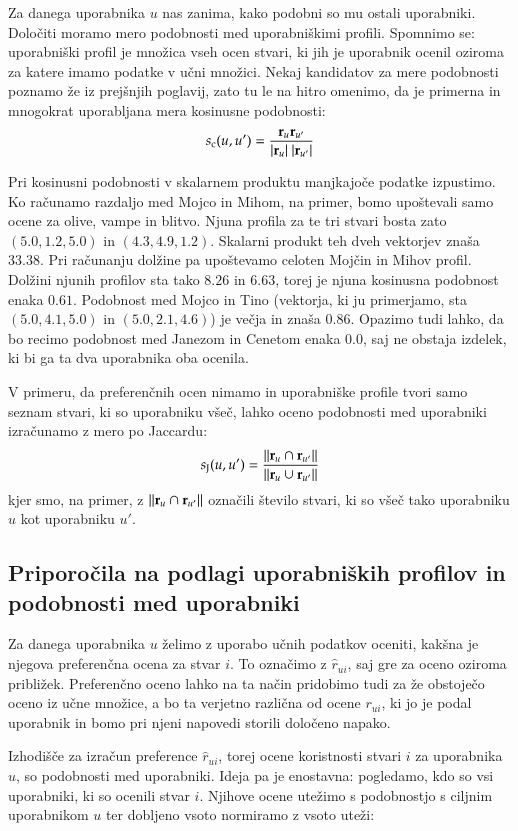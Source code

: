 Za danega uporabnika $u$ nas zanima, kako podobni so mu ostali uporabniki. Določiti moramo mero podobnosti med uporabniškimi profili. Spomnimo se: uporabniški profil je množica vseh ocen stvari, ki jih je uporabnik ocenil oziroma za katere imamo podatke v učni množici. Nekaj kandidatov za mere podobnosti poznamo že iz prejšnjih poglavij, zato tu le na hitro omenimo, da je primerna in mnogokrat uporabljana mera kosinusne podobnosti:
%
$$ s_{\rm c}(u,u')={{\bf r}_u {\bf r}_{u'} \over |{\bf r}_u|\ |{\bf r}_{u'}|}$$
%

Pri kosinusni podobnosti v skalarnem produktu manjkajoče podatke izpustimo. Ko računamo razdaljo med Mojco in Mihom, na primer, bomo upoštevali samo ocene za olive, vampe in blitvo. Njuna profila za te tri stvari bosta zato $(5.0, 1.2, 5.0)$ in $(4.3, 4.9, 1.2)$. Skalarni produkt teh dveh vektorjev znaša $33.38$. Pri računanju dolžine pa upoštevamo celoten Mojčin in Mihov profil. Dolžini njunih profilov sta tako $8.26$ in $6.63$, torej je njuna kosinusna podobnost enaka $0.61$. Podobnost med Mojco in Tino (vektorja, ki ju primerjamo, sta $(5.0, 4.1, 5.0)$ in $(5.0, 2.1, 4.6)$) je večja in znaša $0.86$. Opazimo tudi lahko, da bo recimo podobnost med Janezom in Cenetom enaka $0.0$, saj ne obstaja izdelek, ki bi ga ta dva uporabnika oba ocenila.

V primeru, da preferenčnih ocen nimamo in uporabniške profile tvori samo seznam stvari, ki so uporabniku všeč, lahko oceno podobnosti med uporabniki izračunamo z mero po Jaccardu:
%
$$ s_{\rm J}(u, u')={||{\bf r}_u\cap{\bf r}_{u'}|| \over ||{\bf r}_u\cup{\bf r}_{u'}||}$$
kjer smo, na primer, z $||{\bf r}_u\cap{\bf r}_{u'}||$ označili število stvari, ki so všeč tako uporabniku $u$ kot uporabniku $u'$.

\subsection{Priporočila na podlagi uporabniških profilov in podobnosti med uporabniki}

Za danega uporabnika $u$ želimo z uporabo učnih podatkov oceniti, kakšna je njegova preferenčna ocena za stvar $i$. To označimo z $\hat{r}_{ui}$, saj gre za oceno oziroma približek. Preferenčno oceno lahko na ta način pridobimo tudi za že obstoječo oceno iz učne množice, a bo ta verjetno različna od ocene $r_{ui}$, ki jo je podal uporabnik in bomo pri njeni napovedi storili določeno napako.

Izhodišče za izračun preference $\hat{r}_{ui}$, torej ocene koristnosti stvari $i$ za uporabnika $u$, so podobnosti med uporabniki. Ideja pa je enostavna: pogledamo, kdo so vsi uporabniki, ki so ocenili stvar $i$. Njihove ocene utežimo s podobnostjo s ciljnim uporabnikom $u$ ter dobljeno vsoto normiramo z vsoto uteži:

